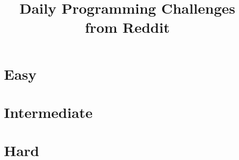 \documentclass{book}
\title{Daily Programming Challenges from Reddit}
\begin{document}
    
\maketitle

\tableofcontents

\chapter{Easy}


\chapter{Intermediate}


\chapter{Hard}

\end{document}
